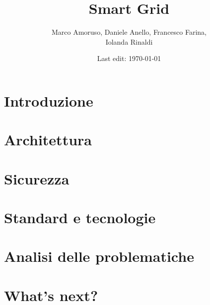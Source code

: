 \documentclass[11pt,oneside]{book}
\title{Smart Grid} %
\author{Marco Amoruso, Daniele Anello, Francesco Farina, \\Iolanda Rinaldi } %
\date{Last edit: \today} %
\newcommand{\initial}[1]{ %
\lettrine[lines=3,lhang=0.3,nindent=0em]{
\color{DarkGoldenrod}
{\textsf{#1}}}{}}
\begin{document}
\maketitle %

\thispagestyle{fancy} %



\tableofcontents
\chapter{Introduzione}

\chapter{Architettura}

\chapter{Sicurezza}

\chapter{Standard e tecnologie}

\chapter{Analisi delle problematiche}

\chapter{What's next?}


\begin{thebibliography}{99} %
\end{thebibliography}

\end{document}
